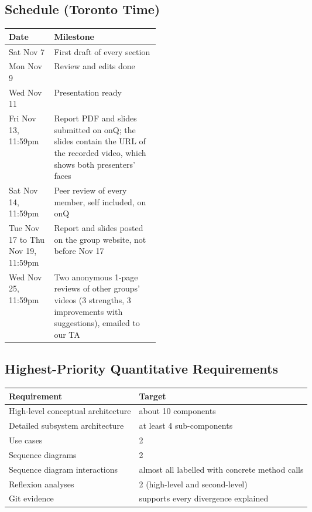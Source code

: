 \subsection*{Schedule (Toronto Time)}

\begin{center}
\small
\begin{tabularx}{\linewidth}{@{}>{\raggedright\arraybackslash}p{0.30\linewidth}X@{}}
  \toprule
  \textbf{Date} & \textbf{Milestone} \\
  \midrule
  Sat Nov 7 & First draft of every section \\
  Mon Nov 9 & Review and edits done \\
  Wed Nov 11 & Presentation ready \\
  Fri Nov 13, 11:59pm & Report PDF and slides submitted on onQ; the slides contain the URL of the recorded video, which shows both presenters' faces \\
  Sat Nov 14, 11:59pm & Peer review of every member, self included, on onQ \\
  Tue Nov 17 to Thu Nov 19, 11:59pm & Report and slides posted on the group website, not before Nov 17 \\
  Wed Nov 25, 11:59pm & Two anonymous 1-page reviews of other groups' videos (3 strengths, 3 improvements with suggestions), emailed to our TA \\
  \bottomrule
\end{tabularx}
\end{center}

\subsection*{Highest-Priority Quantitative Requirements}

\begin{center}
\small
\begin{tabular}{@{}ll@{}}
  \toprule
  \textbf{Requirement} & \textbf{Target} \\
  \midrule
  High-level conceptual architecture & about 10 components \\
  Detailed subsystem architecture & at least 4 sub-components \\
  Use cases & 2 \\
  Sequence diagrams & 2 \\
  Sequence diagram interactions & almost all labelled with concrete method calls \\
  Reflexion analyses & 2 (high-level and second-level) \\
  Git evidence & supports every divergence explained \\
  \bottomrule
\end{tabular}
\end{center}

